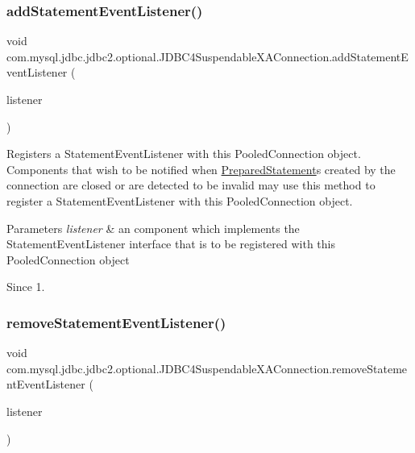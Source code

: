 \subsubsection{\texorpdfstring{add\+Statement\+Event\+Listener()}{addStatementEventListener()}}
{\footnotesize\ttfamily void com.\+mysql.\+jdbc.\+jdbc2.\+optional.\+J\+D\+B\+C4\+Suspendable\+X\+A\+Connection.\+add\+Statement\+Event\+Listener (\begin{DoxyParamCaption}\item[{Statement\+Event\+Listener}]{listener }\end{DoxyParamCaption})}

Registers a {\ttfamily Statement\+Event\+Listener} with this {\ttfamily Pooled\+Connection} object. Components that wish to be notified when {\ttfamily \mbox{\hyperlink{classcom_1_1mysql_1_1jdbc_1_1_prepared_statement}{Prepared\+Statement}}}s created by the connection are closed or are detected to be invalid may use this method to register a {\ttfamily Statement\+Event\+Listener} with this {\ttfamily Pooled\+Connection} object.


\begin{DoxyParams}{Parameters}
{\em listener} & an component which implements the {\ttfamily Statement\+Event\+Listener} interface that is to be registered with this {\ttfamily Pooled\+Connection} object \\
\hline
\end{DoxyParams}
\begin{DoxySince}{Since}
1. 
\end{DoxySince}
\mbox{\label{classcom_1_1mysql_1_1jdbc_1_1jdbc2_1_1optional_1_1_j_d_b_c4_suspendable_x_a_connection_af251cdfe978409bb1a5f8004639731f0}} 
\subsubsection{\texorpdfstring{remove\+Statement\+Event\+Listener()}{removeStatementEventListener()}}
{\footnotesize\ttfamily void com.\+mysql.\+jdbc.\+jdbc2.\+optional.\+J\+D\+B\+C4\+Suspendable\+X\+A\+Connection.\+remove\+Statement\+Event\+Listener (\begin{DoxyParamCaption}\item[{Statement\+Event\+Listener}]{listener }\end{DoxyParamCaption})}

